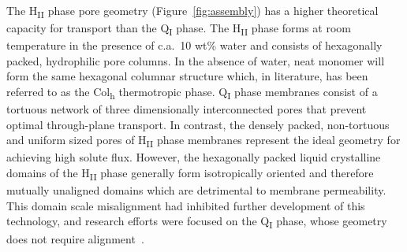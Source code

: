 \documentclass[journal=jpcbfk,manuscript=article]{achemso}
\begin{document}
  The H\textsubscript{II} phase pore geometry (Figure~\ref{fig:assembly}) has a
  higher theoretical capacity for transport than the Q\textsubscript{I} phase.
  The H\textsubscript{II} phase forms at room temperature in the presence of
  c.a.~10 wt\% water and consists of hexagonally packed, hydrophilic pore
  columns\cite{smith_ordered_1997}. In the absence of water, neat monomer will
  form the same hexagonal columnar structure which, in literature, has been
  referred to as the Col\textsubscript{h} thermotropic
  phase\cite{feng_scalable_2014}. 
  Q\textsubscript{I} phase membranes consist of a tortuous network of three
  dimensionally interconnected pores that prevent optimal through-plane
  transport. In contrast, the densely packed, non-tortuous and uniform sized
  pores of H\textsubscript{II} phase membranes represent the ideal geometry for
  achieving high solute flux\cite{matyka_tortuosity-porosity_2008}.  However, the
  hexagonally packed liquid crystalline domains of the H\textsubscript{II} phase
  generally form isotropically oriented and therefore mutually unaligned domains
  which are detrimental to membrane permeability. This domain scale misalignment
  had inhibited further development of this technology, and research efforts
  were focused on the Q\textsubscript{I} phase, whose geometry does not require
  alignment~\cite{zhou_new_2007}. 

\end{document}
